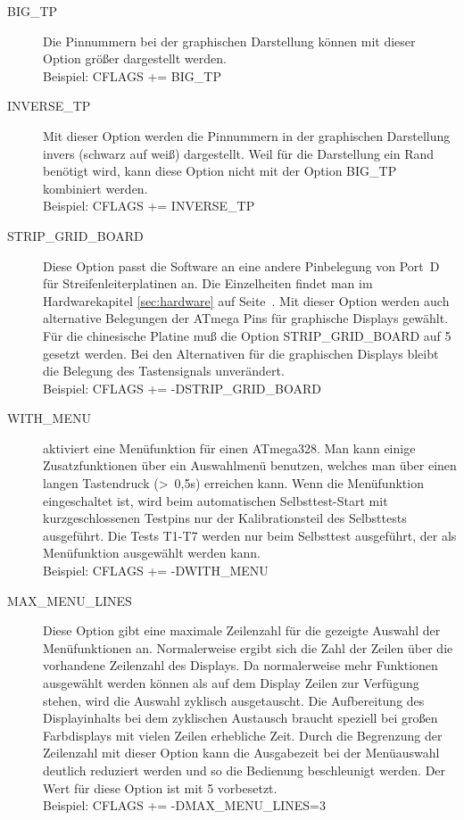 \begin{description}
 \item[BIG\_TP] Die Pinnummern bei der graphischen Darstellung können mit dieser Option größer dargestellt werden.\\
Beispiel: CFLAGS += BIG\_TP

 \item[INVERSE\_TP] Mit dieser Option werden die Pinnummern in der graphischen Darstellung invers (schwarz auf weiß) dargestellt.
Weil für die Darstellung ein Rand benötigt wird, kann diese Option nicht mit der Option BIG\_TP kombiniert werden.\\
Beispiel: CFLAGS += INVERSE\_TP

  \item[STRIP\_GRID\_BOARD] Diese Option passt die Software an eine andere Pinbelegung von Port~D für Streifenleiterplatinen an.
Die Einzelheiten findet man im Hardwarekapitel \ref{sec:hardware} auf Seite~\pageref{sec:hardware}.
Mit dieser Option werden auch alternative Belegungen der ATmega Pins für graphische Displays gewählt.
Für die chinesische  Platine muß die Option STRIP\_GRID\_BOARD auf 5 gesetzt werden.
Bei den Alternativen für die graphischen Displays bleibt die Belegung  des Tastensignals unverändert.\\
Beispiel: CFLAGS += -DSTRIP\_GRID\_BOARD

  \item[WITH\_MENU] aktiviert eine Menüfunktion für einen ATmega328. Man kann einige Zusatzfunktionen über ein
Auswahlmenü benutzen, welches man über einen langen Tastendruck (\textgreater~0,5s) erreichen kann.
Wenn die Menüfunktion eingeschaltet ist, wird beim automatischen Selbsttest-Start mit kurzgeschlossenen Testpins
 nur der Kalibrationsteil des Selbsttests ausgeführt.
Die Tests T1-T7 werden nur beim Selbsttest ausgeführt, der als Menüfunktion ausgewählt werden kann.\\
Beispiel: CFLAGS += -DWITH\_MENU

 \item[MAX\_MENU\_LINES]
Diese Option gibt eine maximale Zeilenzahl für die gezeigte Auswahl der Menüfunktionen an.
Normalerweise ergibt sich die Zahl der Zeilen über die vorhandene Zeilenzahl des Displays.
Da normalerweise mehr Funktionen ausgewählt werden können als auf dem Display Zeilen zur Verfügung stehen,
wird die Auswahl zyklisch ausgetauscht.
Die Aufbereitung des Displayinhalts bei dem zyklischen Austausch braucht speziell bei großen Farbdisplays
mit vielen Zeilen erhebliche Zeit.
Durch die Begrenzung der Zeilenzahl mit dieser Option kann die Ausgabezeit bei der Menüauswahl deutlich reduziert werden
und so die Bedienung beschleunigt werden.
Der Wert für diese Option ist mit 5 vorbesetzt.\\
Beispiel: CFLAGS += -DMAX\_MENU\_LINES=3


\end{description}
